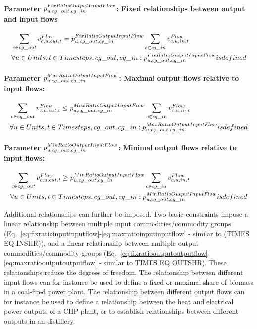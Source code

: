 \paragraph{Parameter $\pFixRatioOutputInputFlow$: Fixed relationships between output and input flows}
\begin{align} \label{eq:fixratiooutputinputflow}
&\sum_{\commodity \in cg\_out} \vFlow[\commodity,\unit,out,\timestep] = \pFixRatioOutputInputFlow \sum_{\commodity \in cg\_in} \vFlow[\commodity,\unit,in,\timestep] \nonumber \\
&\forall \units, \timesteps, cg\_out, cg\_in : \pFixRatioOutputInputFlow is defined
\end{align}

\paragraph{Parameter $\pMaxRatioOutputInputFlow$: Maximal output flows relative to input flows:}
\begin{align} \label{eq:maxratiooutputinputflow}
&\sum_{\commodity \in cg\_out} \vFlow[\commodity,\unit,out,\timestep] \le \pMaxRatioOutputInputFlow \sum_{\commodity \in cg\_in} \vFlow[\commodity,\unit,in,\timestep] \nonumber \\
&\forall \units, \timesteps, cg\_out, cg\_in : \pMaxRatioOutputInputFlow is defined
\end{align}

\paragraph{Parameter $\pMinRatioOutputInputFlow$: Minimal output flows relative to input flows:}
\begin{align} \label{eq:minratiooutputinputflow}
&\sum_{\commodity \in cg\_out} \vFlow[\commodity,\unit,out,\timestep] \ge \pMinRatioOutputInputFlow \sum_{\commodity \in cg\_in} \vFlow[\commodity,\unit,in,\timestep] \nonumber \\
&\forall \units, \timesteps, cg\_out, cg\_in : \pMinRatioOutputInputFlow is defined
\end{align}

Additional relationships can further be imposed. Two basic constraints impose a linear relationship between multiple input commodities/commodity groups (Eq.~\eqref{eq:fixratioinputinputflow}-\eqref{eq:maxratioinputinputflow} - similar to (TIMES EQ INSHR)), and a linear relationship between multiple output commodities/commodity groups (Eq.~\eqref{eq:fixratiooutputoutputflow}-\eqref{eq:maxratiooutputoutputflow} - similar to TIMES EQ OUTSHR). These relationships reduce the degrees of freedom. The relationship between different input flows can for instance be used to define a fixed or maximal share of biomass in a coal-fired power plant. The relationship between different output flows can for instance be used to define a relationship between the heat and electrical power outputs of a CHP plant, or to establish relationships between different outputs in an distillery. 

